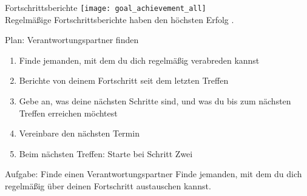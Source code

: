 \begin{frame}[c]{Fortschrittsberichte}
    \small
    \texttt{[image: goal\_achievement\_all]} \\
    Regelmäßige Fortschrittsberichte haben den höchsten Erfolg \cite{better-goals-2}.
\end{frame}


\begin{frame}[c]{Plan: Verantwortungspartner finden}
    \begin{enumerate}[<+(1)->]
        \item Finde jemanden, mit dem du dich regelmäßig verabreden kannst
        \item Berichte von deinem Fortschritt seit dem letzten Treffen
        \item Gebe an, was deine nächsten Schritte sind, und was du bis zum nächsten Treffen erreichen möchtest
        \item Vereinbare den nächsten Termin
        \item Beim nächsten Treffen: Starte bei Schritt Zwei
    \end{enumerate}
\end{frame}


\begin{frame}[c]
    \begin{block}{Aufgabe: Finde einen Verantwortungspartner}
        Finde jemanden, mit dem du dich regelmäßig über deinen
        Fortschritt austauschen kannst.
    \end{block}
\end{frame}

